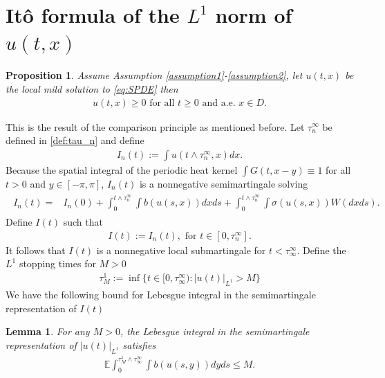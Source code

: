 \documentclass[12pt]{article}
\newtheorem{lemma}[theorem]{Lemma}
\newtheorem{proposition}{Proposition}
\numberwithin{equation}{section}
\begin{document}
\section{\texorpdfstring{It\^{o} formula of the $L^1$ norm of $u(t,x)$}{Ito formula of L1 norm of u(t,x)}}\label{S:Ito of L1}
\begin{proposition}\label{prop:positivity}
Assume Assumption \ref{assumption1}-\ref{assumption2}, let $u(t,x)$ be the local mild solution to \eqref{eq:SPDE} then
    \begin{align}
        u(t,x)\geq 0 \text{ for all }t\geq 0\text{ and a.e. }x\in D.\label{eq:positivity}
    \end{align}
\end{proposition}
This is the result of the comparison principle \cite{Kotelenez1992,Mueller199101} as mentioned before. Let $\tau_n^\infty$ be defined in \eqref{def:tau_n} and define
\begin{align}
    I_n(t):=\int u(t\land\tau_n^\infty,x)dx.\label{def: I_n}
\end{align}
Because the spatial integral of the periodic heat kernel $\int G(t,x-y)\equiv 1$ for all $t>0$ and $y\in [-\pi,\pi]$, $I_n(t)$ is a nonnegative semimartingale solving
\begin{align}
    \begin{split}
        I_n(t)=&I_n(0)+\int_0^{t\land\tau_n^\infty}\int b(u(s,x))dxds+\int_0^{t\land\tau_n^\infty}\int\sigma(u(s,x))W(dxds).
    \end{split} \label{eq:martingale rep of I_n}
\end{align}
Define $I(t)$ such that 
\begin{align}
    I(t):=I_n(t),\textrm{ for }t\in [0,\tau_n^\infty].\label{def:I_t}
\end{align}
It follows that $I(t)$ is a nonnegative local submartingale for $t<\tau_\infty^\infty$. Define the $L^1$ stopping times for $M>0$
\begin{align}
    \tau_M^1:=\inf\{t\in[0,\tau_\infty^\infty):|u(t)|_{L^1}>M\}\label{def:tau_M_1}
\end{align}
 We have the following bound for Lebesgue integral in the semimartingale representation of $I(t)$
\begin{lemma}\label{lem:Lebesgue int}
    For any $M>0$, the Lebesgue integral in the semimartingale representation of $|u(t)|_{L^1}$ satisfies
    \begin{align}
        \mathbb{E}\int_0^{\tau_M^1\land\tau_\infty^\infty}\int b(u(s,y))dyds\leq M.\label{ineq:Lebesgue int}
    \end{align}
\end{lemma}
\end{document}
